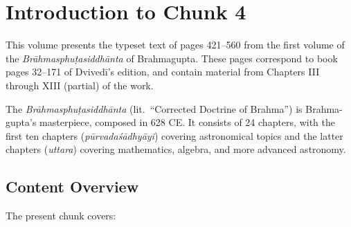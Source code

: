 \documentclass[11pt,a4paper]{article}
\begin{document}
\section*{Introduction to Chunk 4}

This volume presents the typeset text of pages 421--560 from the first volume of the 
\textit{Brāhmasphuṭasiddhānta} of Brahmagupta. These pages correspond to book pages 32--171 
of Dvivedī's edition, and contain material from Chapters III through XIII (partial) of the work.

The \textit{Brāhmasphuṭasiddhānta} (lit.\ ``Corrected Doctrine of Brahma'') is Brahma-\linebreak[0]gupta's 
masterpiece, composed in 628 CE. It consists of 24 chapters, with the first ten chapters 
(\textit{pūrvadaśādhyāyi}) covering astronomical topics and the latter chapters 
(\textit{uttara}) covering mathematics, algebra, and more advanced astronomy.

\subsection*{Content Overview}

The present chunk covers:
\end{document}
